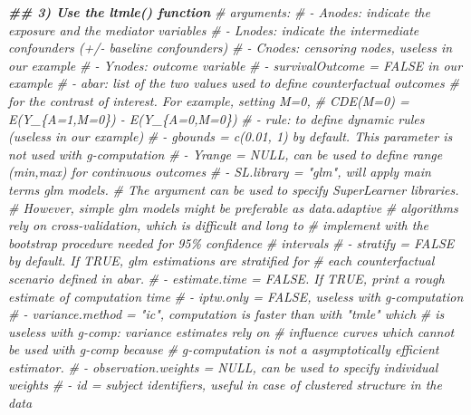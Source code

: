 \documentclass[
]{book}
\newenvironment{Shaded}{\begin{snugshade}}{\end{snugshade}}
\newcommand{\CommentTok}[1]{\textcolor[rgb]{0.56,0.35,0.01}{\textit{#1}}}
\newcommand{\DocumentationTok}[1]{\textcolor[rgb]{0.56,0.35,0.01}{\textbf{\textit{#1}}}}
\begin{document}
\begin{Shaded}
\begin{Highlighting}[]
\DocumentationTok{\#\# 3) Use the ltmle() function}
\CommentTok{\# arguments:}
\CommentTok{\#  {-} Anodes: indicate the exposure and the mediator variables}
\CommentTok{\#  {-} Lnodes: indicate the intermediate confounders (+/{-} baseline confounders)}
\CommentTok{\#  {-} Cnodes: censoring nodes, useless in our example}
\CommentTok{\#  {-} Ynodes: outcome variable}
\CommentTok{\#  {-} survivalOutcome = FALSE in our example}
\CommentTok{\#  {-} abar: list of the two values used to define counterfactual outcomes}
\CommentTok{\#          for the contrast of interest. For example, setting M=0,}
\CommentTok{\#          CDE(M=0) = E(Y\_\{A=1,M=0\}) {-} E(Y\_\{A=0,M=0\})}
\CommentTok{\#  {-} rule: to define dynamic rules (useless in our example)}
\CommentTok{\#  {-} gbounds = c(0.01, 1) by default. This parameter is not used with g{-}computation}
\CommentTok{\#  {-} Yrange = NULL, can be used to define range (min,max) for continuous outcomes}
\CommentTok{\#  {-} SL.library = "glm",  will apply main terms glm models.}
\CommentTok{\#                 The argument can be used to specify SuperLearner libraries.}
\CommentTok{\#                 However, simple glm models might be preferable as data.adaptive}
\CommentTok{\#                 algorithms rely on cross{-}validation, which is difficult and long to}
\CommentTok{\#                 implement with the bootstrap procedure needed for 95\% confidence}
\CommentTok{\#                 intervals}
\CommentTok{\#  {-} stratify = FALSE by default. If TRUE, glm estimations are stratified for}
\CommentTok{\#               each counterfactual scenario defined in abar.}
\CommentTok{\#  {-} estimate.time = FALSE. If TRUE, print a rough estimate of computation time}
\CommentTok{\#  {-} iptw.only = FALSE, useless with g{-}computation}
\CommentTok{\#  {-} variance.method = "ic", computation is faster than with "tmle" which}
\CommentTok{\#                       is useless with g{-}comp: variance estimates rely on}
\CommentTok{\#                       influence curves which cannot be used with g{-}comp because}
\CommentTok{\#                       g{-}computation is not a asymptotically efficient estimator.}
\CommentTok{\#  {-} observation.weights = NULL, can be used to specify individual weights}
\CommentTok{\#  {-} id = subject identifiers, useful in case of clustered structure in the data}


\end{Highlighting}
\end{Shaded}
\end{document}
